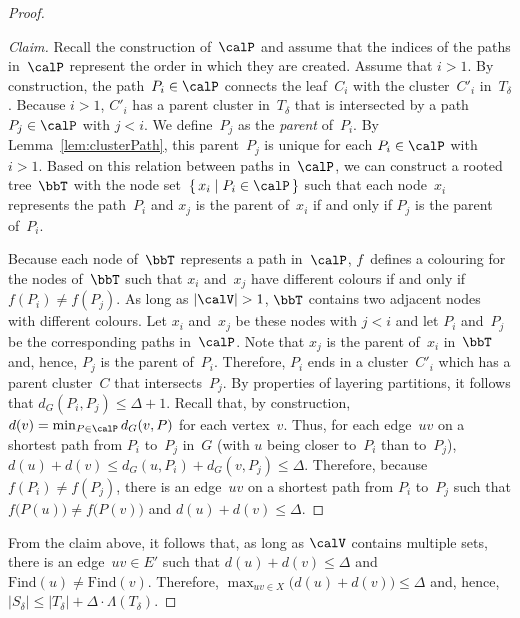\begin{proof}
\begin{proof}[Claim]
Recall the construction of~$\calP$ and assume that the indices of the paths in~$\calP$ represent the order in which they are created.
Assume that $i > 1$.
By construction, the path~$P_i \in \calP$ connects the leaf~$C_i$ with the cluster~$C'_i$ in~$T_\delta$.
Because $i > 1$, $C'_i$ has a parent cluster in~$T_\delta$ that is intersected by a path~$P_j \in \calP$ with $j < i$.
We define~$P_j$ as the \emph{parent} of~$P_i$.
By Lemma~\ref{lem:clusterPath}, this parent~$P_j$ is unique for each $P_i \in \calP$ with~$i > 1$.
Based on this relation between paths in~$\calP$, we can construct a rooted tree~$\bbT$ with the node set~$\{ \, x_i \mid P_i \in \calP \, \}$ such that each node~$x_i$ represents the path~$P_i$ and $x_j$ is the parent of~$x_i$ if and only if $P_j$ is the parent of~$P_i$.

Because each node of~$\bbT$ represents a path in~$\calP$, $f$~defines a colouring for the nodes of~$\bbT$ such that $x_i$ and~$x_j$ have different colours if and only if $f(P_i) \neq f(P_j)$.
As long as $|\calV| > 1$, $\bbT$ contains two adjacent nodes with different colours.
Let $x_i$ and~$x_j$ be these nodes with $j < i$ and let $P_i$ and~$P_j$ be the corresponding paths in~$\calP$.
Note that $x_j$ is the parent of~$x_i$ in~$\bbT$ and, hence, $P_j$ is the parent of~$P_i$.
Therefore, $P_i$ ends in a cluster~$C'_i$ which has a parent cluster~$C$ that intersects~$P_j$.
By properties of layering partitions, it follows that $d_G(P_i, P_j) \leq \Delta + 1$.
Recall that, by construction, $d(v) = \min_{P \in \calP} d_G(v, P)$ for each vertex~$v$.
Thus, for each edge~$uv$ on a shortest path from $P_i$ to~$P_j$ in~$G$ (with $u$ being closer to~$P_i$ than to~$P_j$), $d(u) + d(v) \leq d_G(u, P_i) + d_G(v, P_j) \leq \Delta$.
Therefore, because $f(P_i) \neq f(P_j)$, there is an edge~$uv$ on a shortest path from $P_i$ to~$P_j$ such that $f \big( P(u) \big) \neq f \big( P(v) \big)$ and $d(u) + d(v) \leq \Delta$.
\end{proof}

From the claim above, it follows that, as long as $\calV$ contains multiple sets, there is an edge~$uv \in E'$ such that $d(u) + d(v) \leq \Delta$ and $\mathrm{Find}(u) \neq \mathrm{Find}(v)$.
Therefore, $\max_{uv \in X} \big( d(u) + d(v) \big) \leq \Delta$ and, hence, $|S_\delta| \leq |T_\delta| + \Delta \cdot \Lambda(T_\delta)$.
\end{proof}

